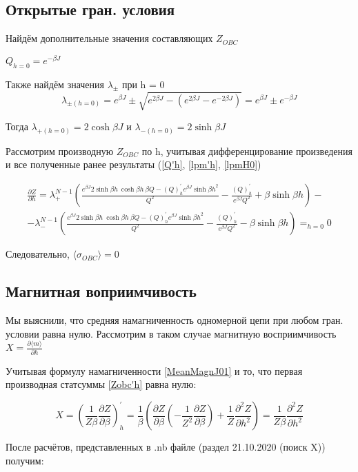 \documentclass{article}
\newcommand{\bj}{\beta J}
\newcommand{\bh}{\beta h}
\newcommand{\lp}{\lambda_{+}}
\newcommand{\lm}{\lambda_{-}}
\newcommand{\obc}{_{OBC}}
\newcommand{\dzdb}{\frac{\partial Z}{\partial \beta}}
\newcommand{\la}{\langle}
\newcommand{\ra}{\rangle}
\numberwithin{equation}{section}
\begin{document}
\subsection{Открытые гран. условия}

Найдём дополнительные значения составляющих $Z\obc$

$Q_{h = 0} = e^{-\bj}$

Также найдём значения $\lambda_{\pm}$ при h = 0
\begin{equation}\label{lpmH0}
    \lambda_{\pm (h=0)} = e^{\bj} \pm \sqrt{e^{2\bj} - \left( e^{2\bj} - e^{-2\bj} \right)} = e^{\bj} \pm e^{-\bj}
\end{equation}

Тогда $ \lambda_{+ (h = 0)} = 2\cosh{\bj} $ и $ \lambda_{- (h = 0)} = 2\sinh{\bj} $

Рассмотрим производную $Z\obc$ по h, учитывая дифференцирование произведения и все полученные ранее результаты (\eqref{Q'h}, \eqref{lpm'h}, \eqref{lpmH0})

\begin{multline}\label{Zobc'h}
    \frac{\partial Z}{\partial h} = \lp^{N-1}(\frac{e^{\bj}2\sinh{\bh}\ \cosh{\bh}\ \beta Q - (Q)^{'}_{h}e^{\bj}\sinh{\bh}^{2}}{Q^{2}} - \frac{(Q)^{'}_{h}}{e^{\bj}Q^{2}} + \beta\sinh{\bh}) - 
    \\
    - \lm^{N-1}(\frac{e^{\bj}2\sinh{\bh}\ \cosh{\bh}\ \beta Q - (Q)^{'}_{h}e^{\bj}\sinh{\bh}^{2}}{Q^{2}} - \frac{(Q)^{'}_{h}}{e^{\bj}Q^{2}} - \beta\sinh{\bh}) =_{h=0} 0
\end{multline} 

Следовательно, $ \la\sigma\obc\ra = 0 $


\subsection{Магнитная воприимчивость}

Мы выяснили, что средняя намагниченность одномерной цепи при любом гран. условии равна нулю. Рассмотрим в таком случае магнитную восприимчивость $ X = \frac{\partial \langle m \rangle}{\partial h}$

Учитывая формулу намагниченности \eqref{MeanMagnJ01} и то, что первая производная статсуммы \eqref{Zobc'h} равна нулю:

\[ X = (\frac{1}{Z \beta} \dzdb)^{'}_{h} = \frac{1}{\beta} (\dzdb (- \frac{1}{Z^{2}} \dzdb) + \frac{1}{Z} \frac{\partial^{2} Z}{\partial h^{2}}) = \frac{1}{Z \beta} \frac{\partial^{2} Z}{\partial h^{2}}\]

После расчётов, представленных в .nb файле (раздел 21.10.2020 (поиск X)) получим:
\end{document}
